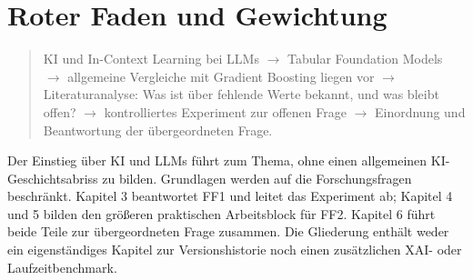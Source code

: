 \documentclass[11pt,a4paper]{article}
\begin{document}
\section*{Roter Faden und Gewichtung}

\begin{quote}
KI und In-Context Learning bei LLMs
$\longrightarrow$ Tabular Foundation Models
$\longrightarrow$ allgemeine Vergleiche mit Gradient Boosting liegen vor
$\longrightarrow$ Literaturanalyse: Was ist über fehlende Werte bekannt,
und was bleibt offen?
$\longrightarrow$ kontrolliertes Experiment zur offenen Frage
$\longrightarrow$ Einordnung und Beantwortung der übergeordneten Frage.
\end{quote}

Der Einstieg über KI und LLMs führt zum Thema, ohne einen allgemeinen
KI-Geschichtsabriss zu bilden. Grundlagen werden auf die Forschungsfragen
beschränkt. Kapitel 3 beantwortet FF1 und leitet das Experiment ab;
Kapitel 4 und 5 bilden den größeren praktischen Arbeitsblock für FF2.
Kapitel 6 führt beide Teile zur übergeordneten Frage zusammen. Die
Gliederung enthält weder ein eigenständiges Kapitel zur
Versionshistorie noch einen zusätzlichen XAI- oder Laufzeitbenchmark.
\end{document}

